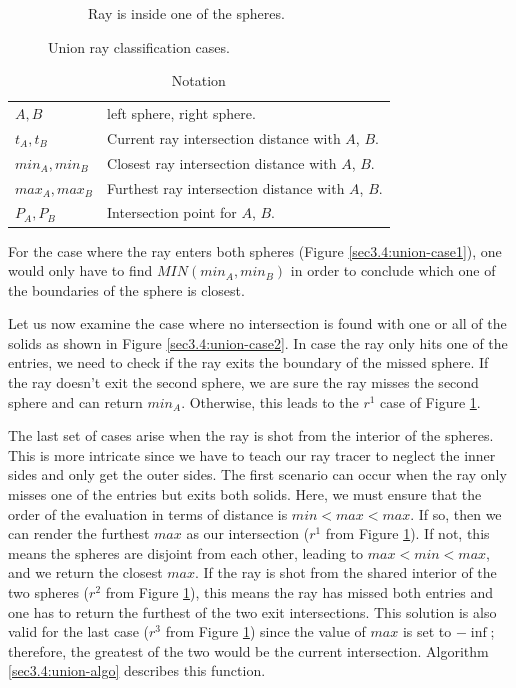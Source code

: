 \documentclass[a4paper,11pt,oneside]{article}
\begin{document}
\begin{figure}[ht]
\begin{subfigure}[b]{0.3\textwidth}
		\caption{Ray is inside one of the spheres.}
		\label{sec3.4:union-case3}
	\end{subfigure}
	\caption{Union ray classification cases.}
	\label{sec3.4:sphere-union}
\end{figure}

\begin{table}
	\caption{Notation}
	\label{table:notations2}
	\begin{tabularx}{\textwidth}{p{}X}
		\toprule
		$A, B$         & left sphere, right sphere.                        \\
		$t_A, t_B$     & Current ray intersection distance with $A$, $B$.  \\
		$min_A, min_B$ & Closest ray intersection distance with $A$, $B$.  \\
		$max_A, max_B$ & Furthest ray intersection distance with $A$, $B$. \\
		$P_A, P_B$     & Intersection point for $A$, $B$.                  \\
		\bottomrule
	\end{tabularx}
\end{table}

For the case where the ray enters both spheres (Figure \ref{sec3.4:union-case1}), one would only have to find $MIN(min_A, min_B)$ in order to conclude which one of the boundaries of the sphere is closest.

Let us now examine the case where no intersection is found with one or all of the solids as shown in Figure \ref{sec3.4:union-case2}. In case the ray only hits one of the entries, we need to check if the ray exits the boundary of the missed sphere. If the ray doesn't exit the second sphere, we are sure the ray misses the second sphere and can return $min_A$. Otherwise, this leads to the $r^1$ case of Figure \ref{sec3.4:union-case3}.

The last set of cases arise when the ray is shot from the interior of the spheres. This is more intricate since we have to teach our ray tracer to neglect the inner sides and only get the outer sides. The first scenario can occur when the ray only misses one of the entries but exits both solids. Here, we must ensure that the order of the evaluation in terms of distance is $min < max < max$. If so, then we can render the furthest $max$ as our intersection ($r^1$ from Figure \ref{sec3.4:union-case3}). If not, this means the spheres are disjoint from each other, leading to $max < min < max$, and we return the closest $max$. If the ray is shot from the shared interior of the two spheres ($r^2$ from Figure \ref{sec3.4:union-case3}), this means the ray has missed both entries and one has to return the furthest of the two exit intersections. This solution is also valid for the last case ($r^3$ from Figure \ref{sec3.4:union-case3}) since the value of $max$ is set to $-\inf$; therefore, the greatest of the two would be the current intersection. Algorithm \ref{sec3.4:union-algo} describes this function.
\end{document}
